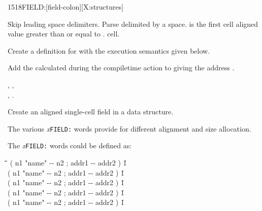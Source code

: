 \pagebreak
\begin{worddef}{1518}{FIELD:}[field-colon][X:structures]
\item {}

	Skip leading space delimiters. Parse  delimited by
	a space.  is the first cell aligned value greater
	than or equal to .   cell.

	Create a definition for  with the execution semantics
	given below.

\execute[name]

	Add the  calculated during the compiletime action
	to  giving the address .

\see {},
	, \\
	,
	.

	\begin{rationale}
		Create an aligned single-cell field in a data structure.

		The various \emph{x}\texttt{FIELD:} words provide for different
		alignment and size allocation.

		The \emph{x}\texttt{FIELD:} words could be defined as:

		\begin{tabbing}
			\tab \= \tab[6] \= \tab[22] \= \tab[5] \= \tab[5.2] \= \kill
			\> \word{:}    \>( n1 "name" -{}- n2 ; addr1 -{}- addr2 )\>    \' 1    \>  \word{;} \\
			\> \word{:}   \>( n1 "name" -{}- n2 ; addr1 -{}- addr2 )\>                  \' 1    \>  \word{;} \\
			\> \word{:}   \>( n1 "name" -{}- n2 ; addr1 -{}- addr2 )\>   \' 1   \>  \word{;} \\
			\> \word{:}  \>( n1 "name" -{}- n2 ; addr1 -{}- addr2 )\>  \' 1  \>  \word{;} \\
			\> \word{:}  \>( n1 "name" -{}- n2 ; addr1 -{}- addr2 )\>  \' 1  \>  \word{;}
		\end{tabbing}
	\end{rationale}
\end{worddef}

